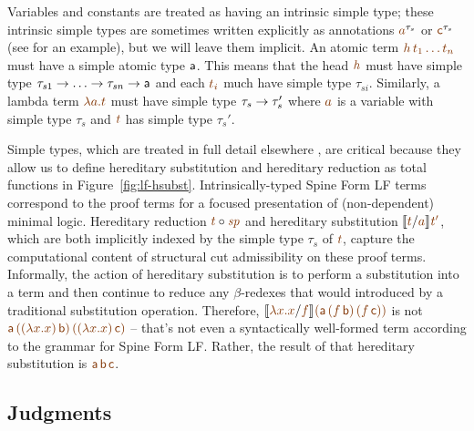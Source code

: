 Variables and constants are treated as having an intrinsic simple
type; these intrinsic simple types are sometimes written explicitly as
annotations $\lf{a}^{\tau_s}$ or $\lf{\sf c}^{\tau_s}$ (see
\cite{pfenning08church} for an example), but we will leave them
implicit.  An atomic term $\lf{h\,t_1\ldots t_n}$ must have a
simple atomic type ${\sf a}$. This means that the head $\lf h$ must
have simple type $\tau_{s1} \rightarrow \ldots \rightarrow \tau_{sn} \rightarrow
{\sf a}$ and each $\lf{t_i}$ much have simple type
$\tau_{si}$. Similarly, a lambda term $\lf{\lambda a. t}$ must have
simple type $\tau_s \rightarrow \tau_s'$ where $\lf a$ is a variable with
simple type $\tau_s$ and $\lf t$ has simple type $\tau_s'$.

Simple types, which are treated in full detail elsewhere
\cite{harper07mechanizing,reed09hybrid}, are critical because they
allow us to define hereditary substitution and hereditary reduction as
total functions in Figure~\ref{fig:lf-hsubst}. Intrinsically-typed
Spine Form LF terms correspond to the proof terms for a focused
presentation of (non-dependent) minimal logic. Hereditary reduction
$\subst{\lf{t}}{\lf{\spi}}$ and hereditary substitution $\rsubst{\lf
  t}{\lf a}{\lf{t'}}$, which are both implicitly indexed by the simple
type $\tau_s$ of $\lf t$, capture the computational content of
structural cut admissibility on these proof terms. Informally, the
action of hereditary substitution is to perform a substitution into a
term and then continue to reduce any $\beta$-redexes that would
introduced by a traditional substitution operation.  Therefore,
$\rsubst{\lf{\lambda x. x}}{\lf f}{\lf{({\sf a}\,(f\,{\sf
      b})\,(f\,{\sf c}))}}$ is not $\lf{{\sf a}\,((\lambda x.x)\,{\sf
    b})\,((\lambda x.x)\,{\sf c})}$ -- that's not even a syntactically
well-formed term according to the grammar for Spine Form LF. Rather,
the result of that hereditary substitution is $\lf{{\sf a}\,{\sf
    b}\,{\sf c}}$.

\subsection{Judgments}
\label{sec:framework-lf-judgments}

